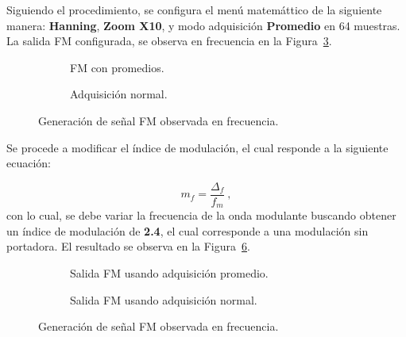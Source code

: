     Siguiendo el procedimiento, se configura el menú matemáttico de la siguiente manera:
    \textbf{Hanning}, \textbf{Zoom X10}, y modo adquisición \textbf{Promedio} en 
    64 muestras. La salida FM configurada, se observa en frecuencia en la Figura~\ref{fig:Exp6SeñalFMConfigurada}.

      \begin{figure}[H]
        \centering
        \begin{subfigure}[H]{0.48\textwidth}
          \caption{FM con promedios.}
          \label{fig:Exp6SeñalFM}
        \end{subfigure}
        \hfill 
        \begin{subfigure}[H]{0.48\textwidth}
          \caption{Adquisición normal.}
          \label{fig:Exp6SeñalFMAdquisicionNormal}
        \end{subfigure}
        \caption{Generación de señal FM observada en frecuencia.}
        \label{fig:Exp6SeñalFMConfigurada}
      \end{figure}

    Se procede a modificar el índice de modulación, el cual responde a la 
    siguiente ecuación:

    \begin{equation*}
      m_{f}=\dfrac{\Delta_{f}}{f_{m}}~,
    \end{equation*}
    con lo cual, se debe variar la frecuencia de la onda modulante buscando obtener 
    un índice de modulación de \textbf{2.4}, el cual corresponde a una modulación sin 
    portadora. El resultado se observa en la 
    Figura~\ref{fig:Exp6SeñalFMindice2_4}.

      \begin{figure}[H]
        \centering
        \begin{subfigure}[H]{0.48\textwidth}
          \caption{Salida FM usando adquisición promedio.}
          \label{fig:Exp6SeñalFMIndice2_4AdquisicionPromedio}
        \end{subfigure}
        \hfill 
        \begin{subfigure}[H]{0.48\textwidth}
          \caption{Salida FM usando adquisición normal.}
          \label{fig:Exp6SeñalFMIndice2_4AdquisicionNormal}
        \end{subfigure}
        \caption{Generación de señal FM observada en frecuencia.}
        \label{fig:Exp6SeñalFMindice2_4}
      \end{figure}   

